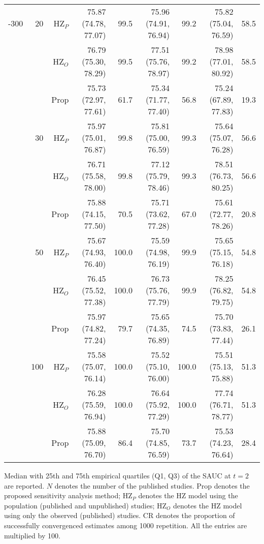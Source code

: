 \begin{table}[!htb]
\begin{threeparttable}
\begin{tabular}[t]{rrrrrrrrr}
\addlinespace
50-300 & 20 & HZ$_P$ & 75.87 (74.78, 77.07) & 99.5 & 75.96 (74.91, 76.94) & 99.2 & 75.82 (75.04, 76.59) & 58.5\\
 &  & HZ$_O$ & 76.79 (75.30, 78.29) & 99.5 & 77.51 (75.76, 78.97) & 99.2 & 78.98 (77.01, 80.92) & 58.5\\
 &  & Prop & 75.73 (72.97, 77.61) & 61.7 & 75.34 (71.77, 77.40) & 56.8 & 75.24 (67.89, 77.83) & 19.3\\
\addlinespace
 & 30 & HZ$_P$ & 75.97 (75.01, 76.87) & 99.8 & 75.81 (75.00, 76.59) & 99.3 & 75.64 (75.07, 76.28) & 56.6\\
 &  & HZ$_O$ & 76.71 (75.58, 78.00) & 99.8 & 77.12 (75.79, 78.46) & 99.3 & 78.51 (76.73, 80.25) & 56.6\\
 &  & Prop & 75.88 (74.15, 77.50) & 70.5 & 75.71 (73.62, 77.28) & 67.0 & 75.61 (72.77, 78.26) & 20.8\\
\addlinespace
 & 50 & HZ$_P$ & 75.67 (74.93, 76.40) & 100.0 & 75.59 (74.98, 76.19) & 99.9 & 75.65 (75.15, 76.18) & 54.8\\
 &  & HZ$_O$ & 76.45 (75.52, 77.38) & 100.0 & 76.73 (75.76, 77.79) & 99.9 & 78.25 (76.82, 79.75) & 54.8\\
 &  & Prop & 75.97 (74.82, 77.24) & 79.7 & 75.65 (74.35, 76.89) & 74.5 & 75.70 (73.83, 77.44) & 26.1\\
\addlinespace
 & 100 & HZ$_P$ & 75.58 (75.07, 76.14) & 100.0 & 75.52 (75.10, 76.00) & 100.0 & 75.51 (75.13, 75.88) & 51.3\\
 &  & HZ$_O$ & 76.28 (75.59, 76.94) & 100.0 & 76.64 (75.92, 77.29) & 100.0 & 77.74 (76.71, 78.77) & 51.3\\
 &  & Prop & 75.88 (75.09, 76.70) & 86.4 & 75.70 (74.85, 76.59) & 73.7 & 75.53 (74.23, 76.64) & 28.4\\
\bottomrule
\end{tabular}
\begin{tablenotes}
\item 
			Median with 25th and 75th empirical quartiles (Q1, Q3) of the SAUC at $t=2$ are reported. 
			$N$ denotes the number of the published studies. 
			Prop denotes the proposed sensitivity analysis method;
			HZ$_P$ denotes the HZ model using the population (published and unpublished) studies; 
			HZ$_O$ denotes the HZ model using only the observed (published) studies.
			CR denotes the proportion of successfully convergenced estimates among 1000 repetition.
			All the entries are multiplied by 100.
\end{tablenotes}
\end{threeparttable}
\end{table}
